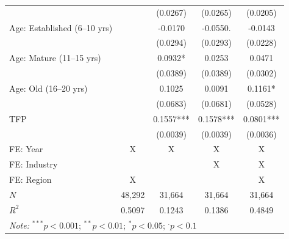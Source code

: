 \begin{table}[htbp]
\begin{tabular}{lcccc}
 &  & (0.0267) & (0.0265) & (0.0205) \\
Age: Established (6--10 yrs) &  & -0.0170 & -0.0550. & -0.0143 \\
 &  & (0.0294) & (0.0293) & (0.0228) \\
Age: Mature (11--15 yrs) &  & 0.0932* & 0.0253 & 0.0471 \\
 &  & (0.0389) & (0.0389) & (0.0302) \\
Age: Old (16--20 yrs) &  & 0.1025 & 0.0091 & 0.1161* \\
 &  & (0.0683) & (0.0681) & (0.0528) \\
TFP &  & 0.1557*** & 0.1578*** & 0.0801*** \\
 &  & (0.0039) & (0.0039) & (0.0036) \\
\hline
FE: Year & X & X & X & X \\
FE: Industry &  &  & X & X \\
FE: Region & X &  &  & X \\
 \hline
$N$ & 48,292 & 31,664 & 31,664 & 31,664 \\
$R^{2}$ & 0.5097 & 0.1243 & 0.1386 & 0.4849 \\
\hline\hline
\multicolumn{5}{l}{\textit{Note:} $^{***}p<0.001$; $^{**}p<0.01$; $^{*}p<0.05$; $^{.}p<0.1$} \\
\end{tabular}
\end{table}
